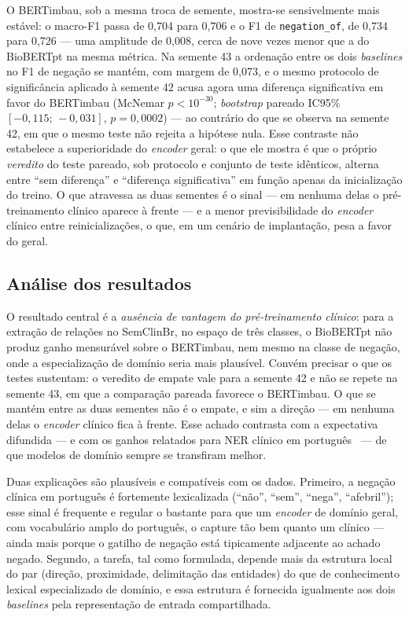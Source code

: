 \documentclass[12pt]{article}
\begin{document}
O BERTimbau, sob a mesma troca de semente, mostra-se sensivelmente mais estável:
o macro-F1 passa de 0,704 para 0,706 e o F1 de \texttt{negation\_of}, de 0,734
para 0,726 --- uma amplitude de 0,008, cerca de nove vezes menor que a do
BioBERTpt na mesma métrica. Na semente 43 a ordenação entre os dois
\emph{baselines} no F1 de negação se mantém, com margem de 0,073, e o mesmo
protocolo de significância aplicado à semente 42 acusa agora uma diferença
significativa em favor do BERTimbau (McNemar $p<10^{-30}$; \emph{bootstrap}
pareado IC95\% $[-0,115;\,-0,031]$, $p=0,0002$) --- ao contrário do que se observa
na semente 42, em que o mesmo teste não rejeita a hipótese nula. Esse contraste
não estabelece a superioridade do \emph{encoder} geral: o que ele mostra é que o
próprio \emph{veredito} do teste pareado, sob protocolo e conjunto de teste
idênticos, alterna entre ``sem diferença'' e ``diferença significativa'' em função
apenas da inicialização do treino. O que atravessa as duas sementes é o sinal ---
em nenhuma delas o pré-treinamento clínico aparece à frente --- e a menor
previsibilidade do \emph{encoder} clínico entre reinicializações, o que, em um
cenário de implantação, pesa a favor do geral.

\subsection{Análise dos resultados}
O resultado central é a \emph{ausência de vantagem do pré-treinamento clínico}:
para a extração de relações no SemClinBr, no espaço de três classes, o BioBERTpt
não produz ganho mensurável sobre o BERTimbau, nem mesmo na classe de negação,
onde a especialização de domínio seria mais plausível. Convém precisar o que os
testes sustentam: o veredito de empate vale para a semente 42 e não se repete na
semente 43, em que a comparação pareada favorece o BERTimbau. O que se mantém
entre as duas sementes não é o empate, e sim a direção --- em nenhuma delas o
\emph{encoder} clínico fica à frente. Esse achado contrasta com a expectativa
difundida --- e com os ganhos
relatados para NER clínico em português~\cite{schneider:20} --- de que modelos de
domínio sempre se transfiram melhor.

Duas explicações são plausíveis e compatíveis com os dados. Primeiro, a negação
clínica em português é fortemente lexicalizada (``não'', ``sem'', ``nega'',
``afebril''); esse sinal é frequente e regular o bastante para que um
\emph{encoder} de domínio geral, com vocabulário amplo do português, o capture
tão bem quanto um clínico --- ainda mais porque o gatilho de negação está
tipicamente adjacente ao achado negado. Segundo, a tarefa, tal
como formulada, depende mais da estrutura local do par (direção, proximidade,
delimitação das entidades) do que de conhecimento lexical especializado de
domínio, e essa estrutura é fornecida igualmente aos dois \emph{baselines} pela
representação de entrada compartilhada.
\end{document}
